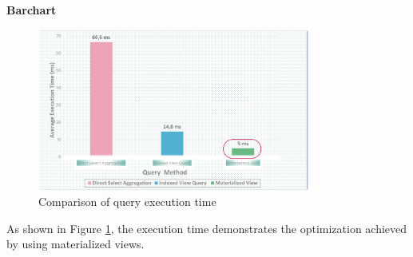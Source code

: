 \textbf{Barchart}



\begin{figure}[H]
\centering
\includegraphics[width=0.8\textwidth]{Figure/Bar_chart.png} %
\caption{Comparison of query execution time} %
\label{fig:execution-plan} %
\end{figure}

As shown in Figure \ref{fig:execution-plan}, the execution time demonstrates the optimization achieved by using materialized views.








